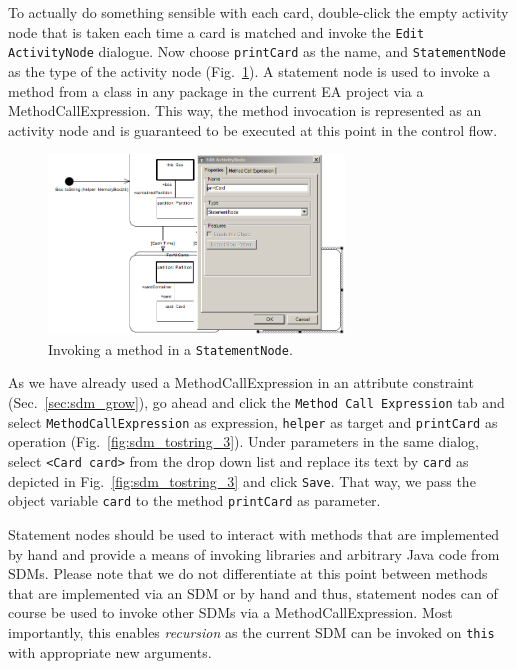 To actually do something sensible with each card, double-click the empty
activity node that is taken each time a card is matched and invoke the \texttt{Edit
ActivityNode} dialogue.  Now choose \texttt{printCard} as
the name, and \texttt{StatementNode} as the type of the activity node
(Fig.~\ref{fig:sdm_tostring_2}).
A statement node is used to invoke a method from a class in any package in the
current EA project via a MethodCallExpression.  This way, the method invocation
is represented as an activity node and is guaranteed to be executed at this
point in the control flow. 

\begin{figure}[htbp]
\begin{center}
  \includegraphics[width=0.7\textwidth]{pics/sdmBilder/toString/sdm73}
  \caption{Invoking a method in a \texttt{StatementNode}.}  
  \label{fig:sdm_tostring_2}
\end{center}
\end{figure}

As we have already used a MethodCallExpression in an attribute constraint
(Sec.~\ref{sec:sdm_grow}), go ahead and click the \texttt{Method Call
Expression} tab and select \texttt{MethodCallExpression} as expression,
\texttt{helper} as target and \texttt{printCard} as operation
(Fig.~\ref{fig:sdm_tostring_3}). Under parameters in the same dialog, select
\texttt{<Card card>} from the drop down list and replace its text by
\texttt{card} as depicted in Fig.~\ref{fig:sdm_tostring_3} and click
\texttt{Save}. That way, we pass the object variable \texttt{card} to the method
\texttt{printCard} as parameter.

Statement nodes should be used to interact with methods that are
implemented by hand and provide a means of invoking libraries and arbitrary Java
code from SDMs.  Please note that we do not differentiate at this point between
methods that are implemented via an SDM or by hand and thus, statement nodes can
of course be used to invoke other SDMs via a MethodCallExpression.  Most
importantly, this enables \emph{recursion} as the current SDM can be invoked on
\texttt{this} with appropriate new arguments.  

